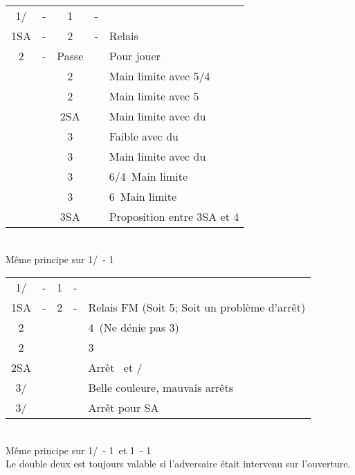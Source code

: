 \documentclass[a4paper, oneside, 11pt]{report}
\begin{document}
		\begin{tabular}{cccc|l}
		1\trefle/\carreau & - & 1\pique & - &\\
		1SA & - & 2\trefle & - & Relais\\
		2\carreau & - & Passe && Pour jouer\\
		&& 2\coeur && Main limite avec 5\pique/4\coeur\\
		&& 2\pique && Main limite avec 5\pique\\
		&& 2SA && Main limite avec du \trefle\\
		&& 3\trefle && Faible avec du \trefle\\
		&& 3\carreau && Main limite avec du \carreau\\
		&& 3\coeur && 6\pique/4\coeur\ Main limite\\
		&& 3\pique && 6\pique\ Main limite\\
		&& 3SA && Proposition entre 3SA et 4\pique\\
		\end{tabular}\\
		Même principe sur 1\trefle/\carreau\ - 1\coeur\\
		
		\begin{tabular}{cccc|l}
		1\trefle/\carreau & - & 1\pique & - &\\
		1SA & - & 2\carreau & - & Relais FM (Soit 5\pique ; Soit un problème d'arrêt)\\
		2\coeur &&&& 4\coeur\ (Ne dénie pas 3\pique)\\
		2\pique &&&& 3\pique\\
		2SA &&&& Arrêt \coeur\ et \carreau/\trefle\\
		3\trefle/\carreau &&&& Belle couleure, mauvais arrêts\\
		3\carreau/\trefle &&&& Arrêt pour SA\\
		\end{tabular}\\
		Même principe sur 1\trefle/\carreau\ - 1\coeur\ et 1\coeur\ - 1\pique\\

		Le double deux est toujours valable si l'adversaire était intervenu sur l'ouverture. \\
\end{document}
